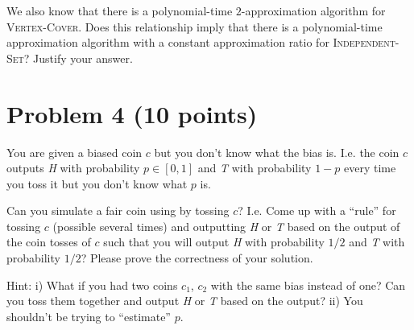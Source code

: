 \documentclass[letterpaper, 11pt]{article}
\begin{document}
We also know that there is a polynomial-time $2$-approximation algorithm for \textsc{Vertex-Cover}. Does this relationship imply that there is a polynomial-time approximation algorithm
with a constant approximation ratio for \textsc{Independent-Set}? Justify your answer.


\section*{Problem 4 (10 points)}
You are given a biased coin $c$ but you don’t know what the bias is. I.e. the coin $c$ outputs \textit{H} with probability $p \in [0, 1]$ and \textit{T} with probability $1-p$ every time you toss it but you don't know what $p$ is. 

Can you simulate a fair coin using by tossing $c$? I.e. Come up with a ``rule'' for tossing $c$ (possible several times) and outputting \textit{H} or \textit{T} based on the output of the coin tosses of $c$ such that you will output \textit{H} with probability $1/2$ and \textit{T} with probability $1/2$? Please prove the correctness of your solution.

Hint: 
i) What if you had two coins $c_1$, $c_2$ with the same bias instead of one? Can you toss them together and output \textit{H} or \textit{T} based on the output? ii) You shouldn't be trying to ``estimate'' $p$.
\end{document}
